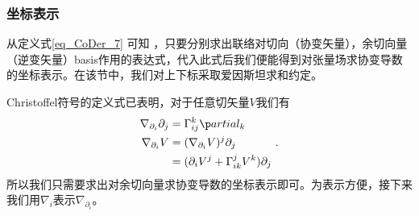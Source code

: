 \subsubsection{坐标表示}
从定义式\autoref{eq_CoDer_7} 可知 ，只要分别求出联络对切向（协变矢量），余切向量（逆变矢量）basis作用的表达式，代入此式后我们便能得到对张量场求协变导数的坐标表示。在该节中，我们对上下标采取爱因斯坦求和约定。

Christoffel符号的定义式已表明，对于任意切矢量$V$我们有
\begin{equation}
\begin{aligned}
\nabla_{\partial_i}\partial_j&=\Gamma^k_{ij}\p artial_k\\
\nabla_{\partial_i}V&=(\nabla_{\partial_i} V)^j\partial_j\\
&=(\partial_iV^j+\Gamma^j_{ik}V^k)\partial_j
\end{aligned}~.
\end{equation}
所以我们只需要求出对余切向量求协变导数的坐标表示即可。为表示方便，接下来我们用$\nabla_i$表示$\nabla_{\partial_i}$。

